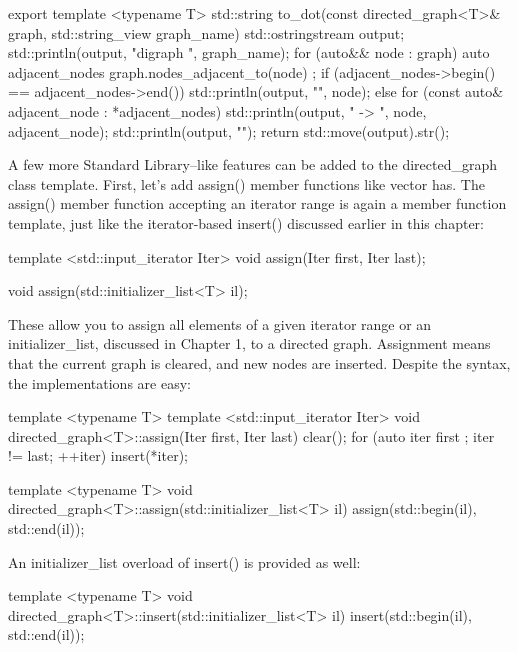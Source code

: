 \begin{cpp}
export template <typename T>
std::string to_dot(const directed_graph<T>& graph, std::string_view graph_name)
{
    std::ostringstream output;
    std::println(output, "digraph {} {{", graph_name);
    for (auto&& node : graph) {
        auto adjacent_nodes { graph.nodes_adjacent_to(node) };
        if (adjacent_nodes->begin() == adjacent_nodes->end()) {
            std::println(output, "{}", node);
        } else {
            for (const auto& adjacent_node : *adjacent_nodes) {
                std::println(output, "{} -> {}", node, adjacent_node);
            }
        }
    }
    std::println(output, "}}");
    return std::move(output).str();
}
\end{cpp}


A few more Standard Library–like features can be added to the directed\_graph class template. First, let’s add assign() member functions like vector has. The assign() member function accepting an iterator range is again a member function template, just like the iterator-based insert() discussed earlier in this chapter:

\begin{cpp}
template <std::input_iterator Iter>
void assign(Iter first, Iter last);

void assign(std::initializer_list<T> il);
\end{cpp}

These allow you to assign all elements of a given iterator range or an initializer\_list, discussed in Chapter 1, to a directed graph. Assignment means that the current graph is cleared, and new nodes are inserted. Despite the syntax, the implementations are easy:

\begin{cpp}
template <typename T>
template <std::input_iterator Iter>
void directed_graph<T>::assign(Iter first, Iter last)
{
    clear();
    for (auto iter { first }; iter != last; ++iter) { insert(*iter); }
}

template <typename T>
void directed_graph<T>::assign(std::initializer_list<T> il)
{
    assign(std::begin(il), std::end(il));
}
\end{cpp}

An initializer\_list overload of insert() is provided as well:

\begin{cpp}
template <typename T>
void directed_graph<T>::insert(std::initializer_list<T> il)
{
    insert(std::begin(il), std::end(il));
}
\end{cpp}

